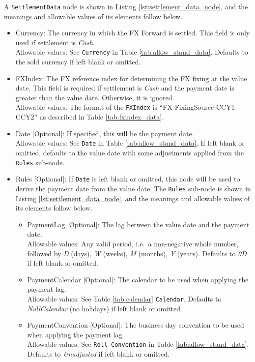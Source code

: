 A \lstinline!SettlementData! node is shown in Listing \ref{lst:settlement_data_node}, and the meanings and allowable values of its elements follow below.

\begin{itemize}
\item Currency: The currency in which the FX Forward is settled. This field is only used if settlement is \emph{Cash}. \\
Allowable values: See \lstinline!Currency! in Table \ref{tab:allow_stand_data}. Defaults to the sold currency if left blank or omitted.
\item FXIndex: The FX reference index for determining the FX fixing at the value date. This field is required if settlement is \emph{Cash}
and the payment date is greater than the value date. Otherwise, it is ignored. \\
Allowable values: The format of the \lstinline!FXIndex! is ``FX-FixingSource-CCY1-CCY2'' as described in Table \ref{tab:fxindex_data}.
\item Date [Optional]: If specified, this will be the payment date. \\
Allowable values: See \lstinline!Date! in Table \ref{tab:allow_stand_data}. If left blank or omitted, defaults to the value date with some adjustments applied
from the \lstinline!Rules! sub-node.
\item Rules [Optional]: If \lstinline!Date! is left blank or omitted, this node will be used to derive the payment date from the value date.
The \lstinline!Rules! sub-node is shown in Listing \ref{lst:settlement_data_node}, and the meanings and allowable values of its elements follow below.
  \begin{itemize}
	\item PaymentLag [Optional]: The lag between the value date and the payment date. \\
	Allowable values: Any valid period, i.e.\ a non-negative whole number, followed by \emph{D} (days), \emph{W} (weeks), \emph{M} (months),
  \emph{Y} (years). Defaults to \emph{0D} if left blank or omitted.
	\item PaymentCalendar [Optional]: The calendar to be used when applying the payment lag. \\
	Allowable values: See Table \ref{tab:calendar} \lstinline!Calendar!. Defaults to \emph{NullCalendar} (no holidays) if left blank or omitted.
	\item PaymentConvention [Optional]: The business day convention to be used when applying the payment lag. \\
	Allowable values: See \lstinline!Roll Convention! in Table \ref{tab:allow_stand_data}. Defaults to \emph{Unadjusted} if left blank or omitted.
  \end{itemize}
\end{itemize}

